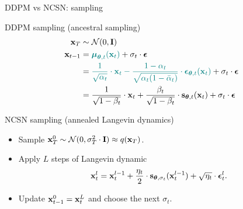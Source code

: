 \begin{frame}{DDPM vs NCSN: sampling}
	\begin{block}{DDPM sampling (ancestral sampling)}
			\vspace{-0.7cm}
			\begin{align*}
				\mathbf{x}_T &\sim \mathcal{N}(0, \mathbf{I}) \\
				\mathbf{x}_{t - 1} &= {\color{teal}\boldsymbol{\mu}_{\boldsymbol{\theta}, t}(\mathbf{x}_t)} + \sigma_t \cdot \boldsymbol{\epsilon} \\
				& ={\color{teal}\frac{1}{\sqrt{\alpha_t}} \cdot \mathbf{x}_t - \frac{1 - \alpha_t}{\sqrt{\alpha_t (1 - \bar{\alpha}_t)}} \cdot \boldsymbol{\epsilon}_{\boldsymbol{\theta}, t}(\mathbf{x}_t)} +  \sigma_t \cdot \boldsymbol{\epsilon} \\
				& = \frac{1}{\sqrt{1 - \beta_t}} \cdot \mathbf{x}_t + \frac{\beta_t}{\sqrt{1 - \beta_t}} \cdot \mathbf{s}_{\boldsymbol{\theta}, t} (\mathbf{x}_t) +  \sigma_t \cdot \boldsymbol{\epsilon}
			\end{align*}
			\vspace{-0.5cm}
	\end{block}
	\begin{block}{NCSN sampling (annealed Langevin dynamics)}
		\begin{itemize}
			\item Sample $\mathbf{x}_T^0 \sim \mathcal{N}(0, \sigma_T^2 \cdot \mathbf{I}) \approx q(\mathbf{x}_T)$.
			\item Apply $L$ steps of Langevin dynamic
			\vspace{-0.2cm}
			\[
				\mathbf{x}_t^l = \mathbf{x}_t^{l-1} + \frac{\eta_t}{2} \cdot \mathbf{s}_{\boldsymbol{\theta}, \sigma_t}(\mathbf{x}_t^{l - 1}) + \sqrt{\eta_t} \cdot \boldsymbol{\epsilon}_t^l.
			\] 
			\vspace{-0.7cm}
			\item Update $\mathbf{x}_{t-1}^0 = \mathbf{x}_t^L$ and choose the next $\sigma_t$.
		\end{itemize}
	\end{block}
	\end{frame}

